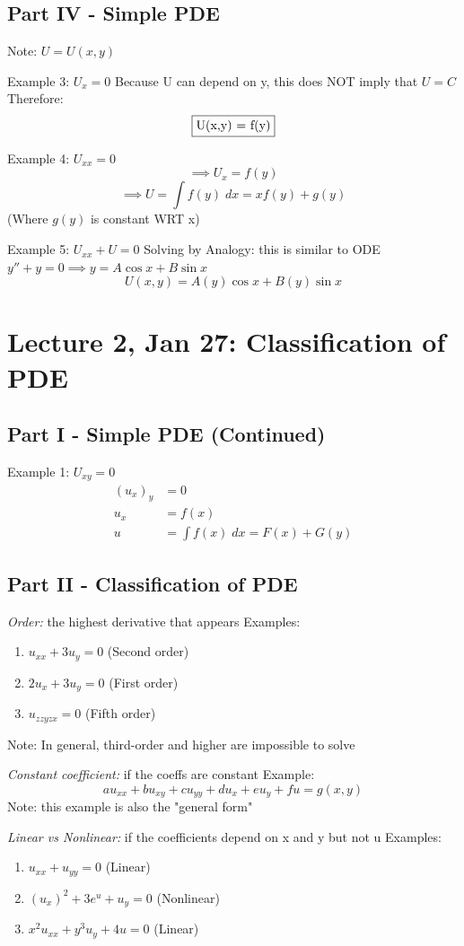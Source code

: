 \documentclass[12pt]{article}
\begin{document}
\subsection*{Part IV - Simple PDE}
Note: $U = U(x, y)$

Example 3: $U_x = 0$
Because U can depend on y, this does NOT imply that $U = C$
Therefore:
\[\boxed{$U(x,y) = f(y)$}\]

Example 4: $U_{xx} = 0$
\[\implies U_x = f(y) \]
\[\implies U = \int f(y)\; dx = \boxed{xf(y) + g(y)}\]
(Where $g(y)$ is constant WRT x)\

Example 5: $U_{xx} + U = 0$
Solving by Analogy: this is similar to ODE $y'' + y = 0 \implies y = A\cos x + B \sin x$
\[\boxed{U(x, y) = A(y)\cos x + B(y)\sin x}\]

\section*{Lecture 2, Jan 27: Classification of PDE}
\subsection*{Part I - Simple PDE (Continued)}
Example 1: $U_{xy} = 0$
\begin{align*}
    (u_x)_y &= 0\\
    u_x &= f(x)\\
    u &= \int f(x) \; dx = \boxed{F(x) + G(y)}
\end{align*}

\subsection*{Part II - Classification of PDE}
\emph{Order:} the highest derivative that appears
Examples:
\begin{enumerate}
    \item $u_{xx} + 3u_y = 0$ \quad (Second order)
    \item $2u_x + 3u_y = 0$ \quad (First order)
    \item $u_{zzyzx} = 0$ \quad (Fifth order)
\end{enumerate}
Note: In general, third-order and higher are impossible to solve 

\emph{Constant coefficient:} if the coeffs are constant
Example:
\[au_{xx} + bu_{xy} + cu_{yy} + du_x + eu_y + fu = g(x, y)\]
Note: this example is also the "general form"

\emph{Linear vs Nonlinear:} if the coefficients depend on x and y but not u 
Examples:
\begin{enumerate}
    \item $u_{xx} + u_{yy} = 0$ \quad (Linear)
    \item $(u_x)^2 + 3e^u + u_y = 0$ \quad (Nonlinear)
    \item $x^2u_{xx} + y^3u_y + 4u = 0$ \quad (Linear)
\end{enumerate}
\end{document}
